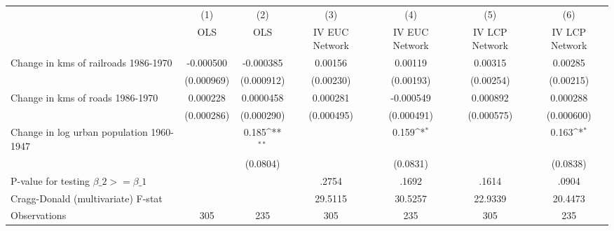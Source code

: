 {
\def\sym#1{\ifmmode^{#1}\else\(^{#1}\)\fi}
\begin{tabular}{l*{6}{c}}
\hline\hline
                &\multicolumn{1}{c}{(1)}&\multicolumn{1}{c}{(2)}&\multicolumn{1}{c}{(3)}&\multicolumn{1}{c}{(4)}&\multicolumn{1}{c}{(5)}&\multicolumn{1}{c}{(6)}\\
                &\multicolumn{1}{c}{OLS}&\multicolumn{1}{c}{OLS}&\multicolumn{1}{c}{IV EUC Network}&\multicolumn{1}{c}{IV EUC Network}&\multicolumn{1}{c}{IV LCP Network}&\multicolumn{1}{c}{IV LCP Network}\\
\hline
Change in kms of railroads 1986-1970&-0.000500         &-0.000385         &  0.00156         &  0.00119         &  0.00315         &  0.00285         \\
                &(0.000969)         &(0.000912)         &(0.00230)         &(0.00193)         &(0.00254)         &(0.00215)         \\
[1em]
Change in kms of roads 1986-1970& 0.000228         &0.0000458         & 0.000281         &-0.000549         & 0.000892         & 0.000288         \\
                &(0.000286)         &(0.000290)         &(0.000495)         &(0.000491)         &(0.000575)         &(0.000600)         \\
[1em]
Change in log urban population 1960-1947&                  &    0.185\sym{**} &                  &    0.159\sym{*}  &                  &    0.163\sym{*}  \\
                &                  & (0.0804)         &                  & (0.0831)         &                  & (0.0838)         \\
\hline
P-value for testing $\beta\_{2} >= \beta\_{1}$&                  &                  &    .2754         &    .1692         &    .1614         &    .0904         \\
Cragg-Donald (multivariate) F-stat&                  &                  &  29.5115         &  30.5257         &  22.9339         &  20.4473         \\
Observations    &      305         &      235         &      305         &      235         &      305         &      235         \\
\hline\hline
\end{tabular}
}
